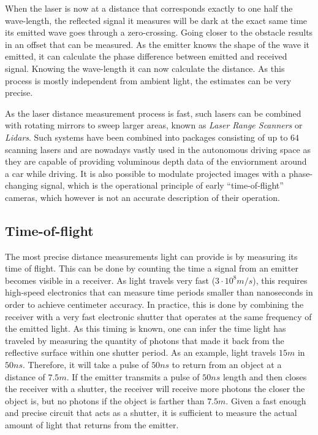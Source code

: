 When the laser is now at a distance that corresponds exactly to one half the wave-length, the reflected signal it measures will be dark at the exact same time its emitted wave goes through a zero-crossing. Going closer to the obstacle results in an offset that can be measured. As the emitter knows the shape of the wave it emitted, it can calculate the phase difference between emitted and received signal. Knowing the wave-length it can now calculate the distance. As this process is mostly independent from ambient light, the estimates can be very precise.

As the laser distance measurement process is fast, such lasers can be combined with rotating mirrors to sweep larger areas, known as \textsl{Laser Range Scanners} or \textsl{Lidars}. Such systems have been combined into packages consisting of up to $64$ scanning lasers and are nowadays vastly used in the autonomous driving space as they are capable of providing voluminous depth data of the enviornment around a car while driving.
It is also possible to modulate projected images with a phase-changing signal, which is the operational principle of early ``time-of-flight'' cameras, which however is not an accurate description of their operation.

\subsection{Time-of-flight}

The most precise distance measurements light can provide is by measuring its time of flight. This can be done by counting the time a signal from an emitter becomes visible in a receiver. As light travels very fast ($3\cdot10^8m/s$), this requires high-speed electronics that can measure time periods smaller than nanoseconds in order to achieve centimeter accuracy.
In practice, this is done by combining the receiver with a very fast electronic shutter that operates at the same frequency of the emitted light. As this timing is known, one can infer the time light has traveled by measuring the quantity of photons that made it back from the reflective surface within one shutter period.
As an example, light travels $15m$ in $50ns$. Therefore, it will take a pulse of $50ns$ to return from an object at a distance of $7.5m$. If the emitter transmits a pulse of $50ns$ length and then closes the receiver with a shutter, the receiver will receive more photons the closer the object is, but no photons if the object is farther than $7.5m$. Given a fast enough and precise circuit that acts as a shutter, it is sufficient to measure the actual amount of light that returns from the emitter.

